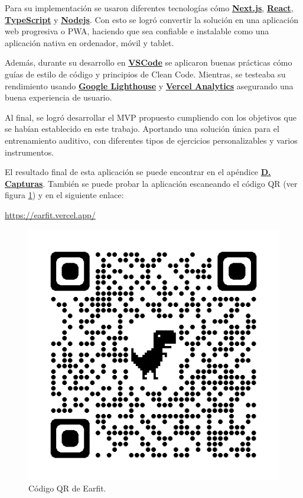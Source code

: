\documentclass[12pt,twoside,titlepage]{report}
\begin{document}
Para su implementación se usaron diferentes tecnologías cómo \hyperref[sec:Next]{\textbf{Next.js}}, \hyperref[sec:React]{\textbf{React}}, \hyperref[sec:TypeScript]{\textbf{TypeScript}} y \hyperref[sec:Node]{\textbf{Nodejs}}. Con esto se logró convertir la solución en una aplicación web progresiva o PWA, haciendo que sea confiable e instalable como una aplicación nativa en ordenador, móvil y tablet. 

Además, durante su desarrollo en \hyperref[sec:VSCode]{\textbf{VSCode}} se aplicaron buenas prácticas cómo guías de estilo de código y principios de Clean Code. Mientras, se testeaba su rendimiento usando \hyperref[sec:lighthouse]{\textbf{Google Lighthouse}} y \hyperref[sec:analytics]{\textbf{Vercel Analytics}} asegurando una buena experiencia de usuario.

Al final, se logró desarrollar el MVP propuesto cumpliendo con los objetivos que se habían establecido en este trabajo. Aportando una solución única para el entrenamiento auditivo, con diferentes tipos de ejercicios personalizables y varios instrumentos. 

El resultado final de esta aplicación se puede encontrar en el apéndice \hyperref[sec:Capturas]{\textbf{D. Capturas}}. También se puede probar la aplicación escaneando el código QR (ver figura \ref{fig:EarfitQR}) y en el siguiente enlace: 

\url{https://earfit.vercel.app/}

\begin{figure}[H]
    \centering
    \includegraphics[scale=0.25]{Conclusiones/EarfitQR}
    \caption{Código QR de Earfit.}
    \label{fig:EarfitQR}
\end{figure}
\end{document}
